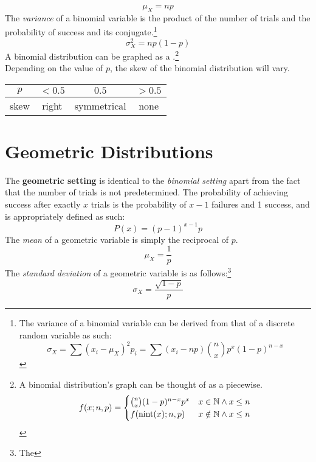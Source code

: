 \documentclass[../AP_Statistics.tex]{subfiles}
\begin{document}
			\[\mu_X = np\]
			The \emph{variance} of a binomial variable is the product of the number of trials and the probability of success and its conjugate.\footnote{The variance of a binomial variable can be derived from that of a discrete random variable as such:\[\sigma_X = \sum(x_i - \mu_X)^2p_i = \sum(x_i - np)\binom{n}{x}p^x(1 - p)^{n - x}\]}
			\[\sigma_X^2 = np(1 - p)\]
			A binomial distribution can be graphed as a .\footnote{A binomial distribution's graph can be thought of as a piecewise.\[f(x; n, p) = \begin{cases}\binom{n}{x}(1 - p)^{n - x}p^x & x \in \mathbb{N} \land x \le n\\ f(\operatorname{nint}(x); n, p) & x \notin \mathbb{N} \land x \le n\end{cases}\]} \\
			Depending on the value of $p$, the skew of the binomial distribution will vary. \\
			\begin{center}
				\begin{tabular}{|c|ccc|}\hline
					$p$ & $<0.5$ & $0.5$ & $>0.5$ \\\hline
					skew & right & symmetrical & none \\\hline
				\end{tabular}
			\end{center}
		\section{Geometric Distributions}
			The \textbf{geometric setting} is identical to the \emph{binomial setting} apart from the fact that the number of trials is not predetermined.
			The probability of achieving success after exactly $x$ trials is the probability of $x - 1$ failures and 1 success, and is appropriately defined as such:
			\[P(x) = (p - 1)^{x - 1}p\]
			The \emph{mean} of a geometric variable is simply the reciprocal of $p$.
			\[\mu_X = \frac{1}{p}\]
			The \emph{standard deviation} of a geometric variable is as follows:\footnote{The }
			\[\sigma_X = \frac{\sqrt{1 - p}}{p}\]
			
\end{document}
